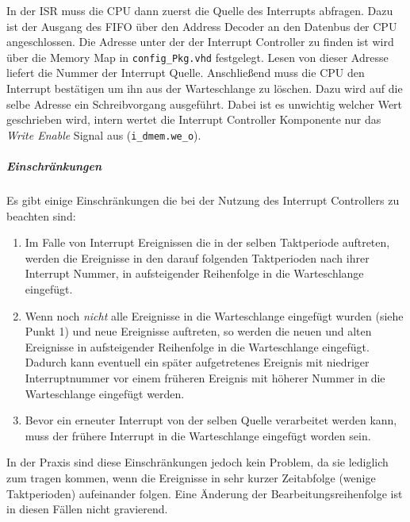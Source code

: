 In der \gls{ISR} muss die CPU dann zuerst die Quelle des Interrupts abfragen. Dazu ist der Ausgang des FIFO über den Address Decoder an den Datenbus der CPU angeschlossen. Die Adresse unter der der Interrupt Controller zu finden ist wird über die Memory Map in \lstinline$config_Pkg.vhd$ festgelegt. Lesen von dieser Adresse liefert die Nummer der Interrupt Quelle. Anschließend muss die CPU den Interrupt bestätigen um ihn aus der Warteschlange zu löschen. Dazu wird auf die selbe Adresse ein Schreibvorgang ausgeführt. Dabei ist es unwichtig welcher Wert geschrieben wird, intern wertet die Interrupt Controller Komponente nur das \emph{Write Enable} Signal aus (\lstinline$i_dmem.we_o$).

\subparagraph{Einschränkungen} Es gibt einige Einschränkungen die bei der Nutzung des Interrupt Controllers zu beachten sind:
\begin{enumerate}
    \item Im Falle von Interrupt Ereignissen die in der selben Taktperiode auftreten, werden die Ereignisse in den darauf folgenden Taktperioden nach ihrer Interrupt Nummer, in aufsteigender Reihenfolge in die Warteschlange eingefügt.
    \item Wenn noch \emph{nicht} alle Ereignisse in die Warteschlange eingefügt wurden (siehe Punkt 1) und neue Ereignisse auftreten, so werden die neuen und alten Ereignisse in aufsteigender Reihenfolge in die Warteschlange eingefügt. Dadurch kann eventuell ein später aufgetretenes Ereignis mit niedriger Interruptnummer vor einem früheren Ereignis mit höherer Nummer in die Warteschlange eingefügt werden.
    \item Bevor ein erneuter Interrupt von der selben Quelle verarbeitet werden kann, muss der frühere Interrupt in die Warteschlange eingefügt worden sein.
\end{enumerate}

In der Praxis sind diese Einschränkungen jedoch kein Problem, da sie lediglich zum tragen kommen, wenn die Ereignisse in sehr kurzer Zeitabfolge (wenige Taktperioden) aufeinander folgen. Eine Änderung der Bearbeitungsreihenfolge ist in diesen Fällen nicht gravierend.

